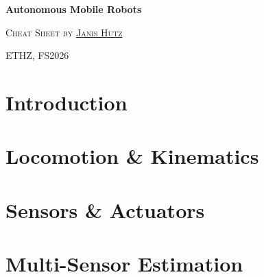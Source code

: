\documentclass[9pt]{extarticle}
\begin{document}
\noverticalspacing

\vspace*{0mm}

\begin{center}
    \begin{Large}
        \textbf{Autonomous Mobile Robots}
    \end{Large}

    \textsc{Cheat Sheet by {\color{MidnightBlue}\href{https://janishutz.com}{Janis Hutz}}}

    \textsc{ETHZ, FS2026}
\end{center}


\section{Introduction}





\section{Locomotion \& Kinematics}







% 

\section{Sensors \& Actuators}





% 

\section{Multi-Sensor Estimation}







% 
\end{document}
